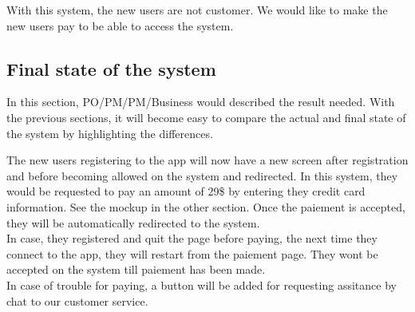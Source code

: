 \documentclass[a4paper,article,oneside]{memoir}
\begin{document}
                \noindent{}
                
        With this system, the new users are not customer. We would like to make the new users pay to be able to access the system.
        \subsection{Final state of the system}
        In this section, \gls{PO}/\gls{PM}/\gls{PM}/\gls{Business} would described the result needed. With the previous sections, it will become easy to compare the actual and final state of the system by highlighting the differences.
        
                        \noindent{}
                        
        The new users registering to the app will now have a new screen after registration and before becoming allowed on the system and redirected. In this system, they would be requested to pay an amount of 29\$ by entering they credit card information. See the mockup in the other section. Once the paiement is accepted, they will be automatically redirected to the system. \\ In case, they registered and quit the page before paying, the next time they connect to the app, they will restart from the paiement page. They wont be accepted on the system till paiement has been made. \\ In case of trouble for paying, a button will be added for requesting assitance by chat to our customer service.
\end{document}
